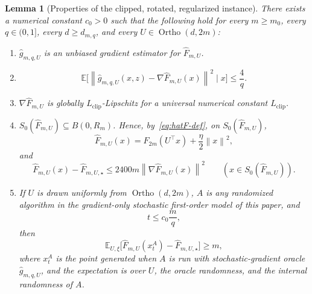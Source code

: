 \documentclass[11pt]{article}
\newtheorem{lemma}[theorem]{Lemma}
\newcommand{\E}{\mathbb{E}}
\newcommand{\norm}[1]{\left\lVert #1\right\rVert}
\newcommand{\Ortho}{\operatorname{Ortho}}
\begin{document}
\begin{lemma}[Properties of the clipped, rotated, regularized instance]
\label{lem:clipped-rotated}
There exists a numerical constant $c_0>0$ such that the following hold for every $m\ge m_0$, every $q\in(0,1]$, every $d\ge d_{m,q}$, and every $U\in \Ortho(d,2m)$:
\begin{enumerate}[label=\arabic*.,leftmargin=1.5em]
    \item $\widehat g_{m,q,U}$ is an unbiased gradient estimator for $\widehat F_{m,U}$.
    \item
    \[
    \E\bigl[\norm{\widehat g_{m,q,U}(x,z)-\nabla \widehat F_{m,U}(x)}^2\mid x\bigr]\le \frac{4}{q}.
    \]
    \item $\nabla \widehat F_{m,U}$ is globally $L_{\mathrm{clip}}$-Lipschitz for a universal numerical constant $L_{\mathrm{clip}}$.
    \item $S_0(\widehat F_{m,U})\subseteq B(0,R_m)$.
    Hence, by~\eqref{eq:hatF-def}, on $S_0(\widehat F_{m,U})$,
    \[
    \widehat F_{m,U}(x)=F_{2m}(U^\top x)+\frac{\eta}{2}\norm{x}^2,
    \]
    and
    \[
    \widehat F_{m,U}(x)-\widehat F_{m,U,\star}\le 2400m\norm{\nabla \widehat F_{m,U}(x)}^2
    \qquad
    (x\in S_0(\widehat F_{m,U})).
    \]
    \item If $U$ is drawn uniformly from $\Ortho(d,2m)$, $A$ is any randomized algorithm in the gradient-only stochastic
    first-order model of this paper, and
    \[
    t\le c_0\frac{m}{q},
    \]
    then
    \[
    \E_{U,\xi}\bigl[\widehat F_{m,U}(x_t^A)-\widehat F_{m,U,\star}\bigr]\ge m,
    \]
    where \(x_t^A\) is the point generated when \(A\) is run with stochastic-gradient oracle
    \(\widehat g_{m,q,U}\), and the expectation is over $U$, the oracle randomness, and the internal randomness of $A$.
\end{enumerate}
\end{lemma}
\end{document}

